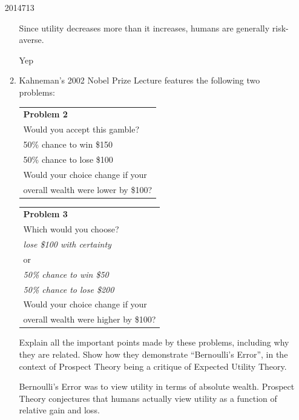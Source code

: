 \documentclass[10pt,\jkfside,a4paper]{article}
\begin{document}
\begin{enumerate}
\begin{examquestion}{2014}{7}{13}
\begin{enumerate}[label=(\alph*)]
Since utility decreases more than it increases, humans are generally risk-averse.

{\color{blue}
Yep
}

\item Kahneman's 2002 Nobel Prize Lecture features the following two problems:

\begin{multicols}{2}

\begin{tabular}{|l|}
\hline 
\textbf{Problem 2} \\
Would you accept this gamble? \\
50\% chance to win \$150 \\
50\% chance to lose \$100 \\
Would your choice change if your \\
overall wealth were lower by \$100? \\
\hline
\end{tabular}

\begin{tabular}{|l|}
\hline 
\textbf{Problem 3} \\
Which would you choose? \\
\textit{lose \$100 with certainty} \\
or \\
\textit{50\% chance to win \$50} \\
\textit{50\% chance to lose \$200} \\
Would your choice change if your \\
overall wealth were higher by \$100? \\
\hline
\end{tabular}

\end{multicols}

Explain all the important points made by these problems, including why they are related.
Show how they demonstrate ``Bernoulli's Error'', in the context of Prospect Theory being
a critique of Expected Utility Theory.

Bernoulli's Error was to view utility in terms of absolute wealth.
Prospect Theory conjectures that humans actually view utility as a
function of relative gain and loss.


\end{enumerate}
\end{examquestion}
\end{enumerate}
\end{document}
